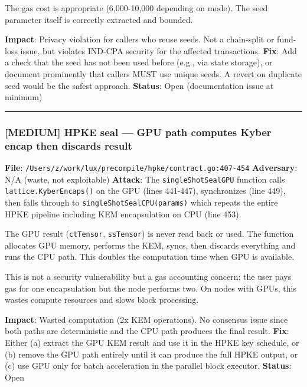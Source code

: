 \documentclass[
]{article}
\begin{document}
The gas cost is appropriate (6,000-10,000 depending on mode). The seed
parameter itself is correctly extracted and bounded.

\textbf{Impact}: Privacy violation for callers who reuse seeds. Not a
chain-split or fund-loss issue, but violates IND-CPA security for the
affected transactions. \textbf{Fix}: Add a check that the seed has not
been used before (e.g., via state storage), or document prominently that
callers MUST use unique seeds. A revert on duplicate seed would be the
safest approach. \textbf{Status}: Open (documentation issue at minimum)

\begin{center}\rule{0.5\linewidth}{0.5pt}\end{center}

\subsubsection{{[}MEDIUM{]} HPKE seal --- GPU path computes Kyber encap
then discards
result}\label{medium-hpke-seal--gpu-path-computes-kyber-encap-then-discards-result}

\textbf{File}:
\texttt{/Users/z/work/lux/precompile/hpke/contract.go:407-454}
\textbf{Adversary}: N/A (waste, not exploitable) \textbf{Attack}: The
\texttt{singleShotSealGPU} function calls \texttt{lattice.KyberEncaps()}
on the GPU (lines 441-447), synchronizes (line 449), then falls through
to \texttt{singleShotSealCPU(params)} which repeats the entire HPKE
pipeline including KEM encapsulation on CPU (line 453).

The GPU result (\texttt{ctTensor}, \texttt{ssTensor}) is never read back
or used. The function allocates GPU memory, performs the KEM, syncs,
then discards everything and runs the CPU path. This doubles the
computation time when GPU is available.

This is not a security vulnerability but a gas accounting concern: the
user pays gas for one encapsulation but the node performs two. On nodes
with GPUs, this wastes compute resources and slows block processing.

\textbf{Impact}: Wasted computation (2x KEM operations). No consensus
issue since both paths are deterministic and the CPU path produces the
final result. \textbf{Fix}: Either (a) extract the GPU KEM result and
use it in the HPKE key schedule, or (b) remove the GPU path entirely
until it can produce the full HPKE output, or (c) use GPU only for batch
acceleration in the parallel block executor. \textbf{Status}: Open
\end{document}
